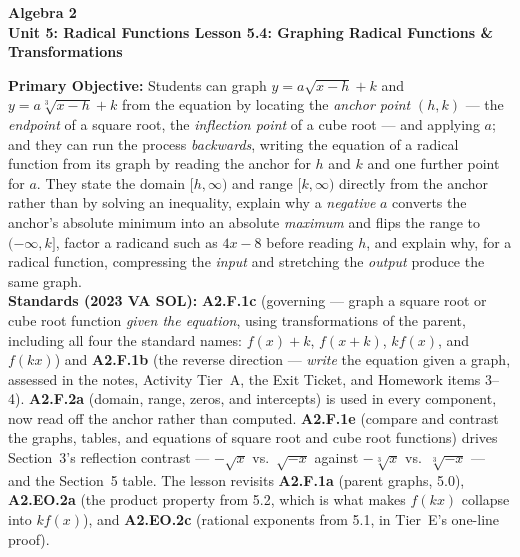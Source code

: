 \documentclass[10pt]{article}
\newcommand{\CourseName}{Algebra 2}
\newcommand{\UnitNumberName}{Unit 5: Radical Functions \quad}
\newcommand{\LessonNumberName}{Lesson 5.4: Graphing Radical Functions \& Transformations}
\begin{document}
\begin{center}
    {\Large\bfseries \CourseName \\
    {\small\bfseries \UnitNumberName \LessonNumberName}}
\end{center}

\begin{tcolorbox}[colback=forestbg, colframe=forest, boxrule=0.9pt, arc=2mm,
    left=2mm, right=2mm, top=1.5mm, bottom=1.5mm]
    \textbf{Primary Objective:} Students can graph $y=a\sqrt{x-h}+k$ and $y=a\sqrt[3]{x-h}+k$ from
    the equation by locating the \emph{anchor point} $(h,k)$ --- the \emph{endpoint} of a square root,
    the \emph{inflection point} of a cube root --- and applying $a$; and they can run the process
    \emph{backwards}, writing the equation of a radical function from its graph by reading the anchor
    for $h$ and $k$ and one further point for $a$. They state the domain $[h,\infty)$ and range
    $[k,\infty)$ directly from the anchor rather than by solving an inequality, explain why a
    \emph{negative} $a$ converts the anchor's absolute minimum into an absolute \emph{maximum} and
    flips the range to $(-\infty,k]$, factor a radicand such as $4x-8$ before reading $h$, and explain
    why, for a radical function, compressing the \emph{input} and stretching the \emph{output} produce
    the same graph.
    \\[2pt]
    \textbf{Standards (2023 VA SOL):} \textbf{A2.F.1c} (governing --- graph a square root or cube root
    function \emph{given the equation}, using transformations of the parent, including all four the
    standard names: $f(x)+k$, $f(x+k)$, $kf(x)$, and $f(kx)$) and \textbf{A2.F.1b} (the reverse
    direction --- \emph{write} the equation given a graph, assessed in the notes, Activity Tier~A,
    the Exit Ticket, and Homework items 3--4). \textbf{A2.F.2a} (domain, range, zeros, and intercepts)
    is used in every component, now read off the anchor rather than computed. \textbf{A2.F.1e}
    (compare and contrast the graphs, tables, and equations of square root and cube root functions)
    drives Section~3's reflection contrast --- $-\sqrt{x}$ vs.\ $\sqrt{-x}$ against
    $-\sqrt[3]{x}$ vs.\ $\sqrt[3]{-x}$ --- and the Section~5 table. The lesson revisits
    \textbf{A2.F.1a} (parent graphs, 5.0), \textbf{A2.EO.2a} (the product property from 5.2, which is
    what makes $f(kx)$ collapse into $kf(x)$), and \textbf{A2.EO.2c} (rational exponents from 5.1, in
    Tier~E's one-line proof).
\end{tcolorbox}
\end{document}
